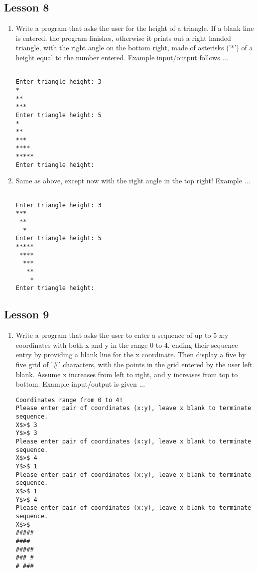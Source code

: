\documentclass[a4paper,11pt]{article}
\begin{document}
\subsection{Lesson 8}

\begin{enumerate}
	\item Write a program that asks the user for the height of a triangle.    If a blank line is entered, the program finishes, otherwise it    prints out a right handed triangle, with the right angle on the    bottom right, made of asterisks ('*') of a height equal to the    number entered. Example input/output follows ...      
\begin{lstlisting}

Enter triangle height: 3
*
**
***
Enter triangle height: 5
*
**
***
****
*****
Enter triangle height: 
\end{lstlisting}
	\item Same as above, except now with the right angle in the top right! Example ...      
\begin{lstlisting}

Enter triangle height: 3
***
 **
  *
Enter triangle height: 5
*****
 ****
  ***
   **
    *
Enter triangle height: 
\end{lstlisting}
\end{enumerate}

\subsection{Lesson 9}

\begin{enumerate}
	\item Write a program that asks the user to enter a sequence of up to    5 x:y coordinates with both x and y in the range 0 to 4, ending    their sequence entry by providing a blank line for the x    coordinate. Then display a five by five grid of '\#' characters,    with the points in the grid entered by the user left blank. Assume    x increases from left to right, and y increases from top to bottom.    Example input/output is given ...          
\begin{lstlisting}
Coordinates range from 0 to 4!
Please enter pair of coordinates (x:y), leave x blank to terminate sequence.
X$>$ 3
Y$>$ 3
Please enter pair of coordinates (x:y), leave x blank to terminate sequence.
X$>$ 4
Y$>$ 1
Please enter pair of coordinates (x:y), leave x blank to terminate sequence.
X$>$ 1
Y$>$ 4
Please enter pair of coordinates (x:y), leave x blank to terminate sequence.
X$>$
#####
#### 
#####
### #
# ###
\end{lstlisting}
\end{enumerate}
\end{document}
